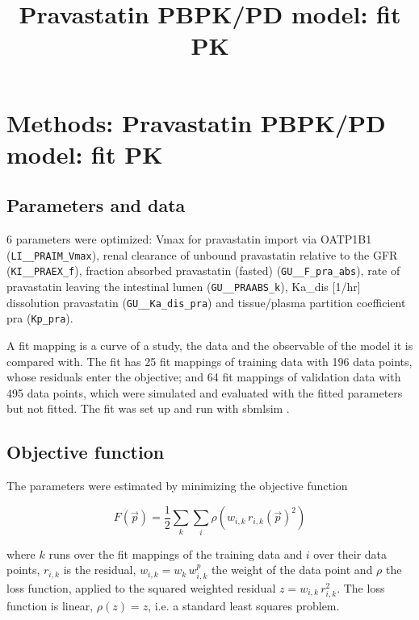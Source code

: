 \documentclass{article}
\title{Pravastatin PBPK/PD model: fit PK}
\date{}
\begin{document}
\maketitle

\section{Methods: Pravastatin PBPK/PD model: fit PK}

\subsection{Parameters and data}

6 parameters were optimized: Vmax for pravastatin import via OATP1B1 (\texttt{LI\_\_PRAIM\_Vmax}), renal clearance of unbound pravastatin relative to the GFR (\texttt{KI\_\_PRAEX\_f}), fraction absorbed pravastatin (fasted) (\texttt{GU\_\_F\_pra\_abs}), rate of pravastatin leaving the intestinal lumen (\texttt{GU\_\_PRAABS\_k}), Ka\_dis [1/hr] dissolution pravastatin (\texttt{GU\_\_Ka\_dis\_pra}) and tissue/plasma partition coefficient pra (\texttt{Kp\_pra}).

A fit mapping is a curve of a study, the data and the observable of the model it is compared with. The fit has 25 fit mappings of training data with 196 data points, whose residuals enter the objective; and 64 fit mappings of validation data with 495 data points, which were simulated and evaluated with the fitted parameters but not fitted. The fit was set up and run with sbmlsim \cite{Koenig2026_sbmlsim}.

\subsection{Objective function}

The parameters were estimated by minimizing the objective function

\begin{equation}
F(\vec{p}) = \frac{1}{2} \sum_{k} \sum_{i} \rho\left(w_{i,k}\, r_{i,k}(\vec{p})^2\right)
\end{equation}

where $k$ runs over the fit mappings of the training data and $i$ over their data points, $r_{i,k}$ is the residual, $w_{i,k} = w_k\, w^{p}_{i,k}$ the weight of the data point and $\rho$ the loss function, applied to the squared weighted residual $z = w_{i,k}\, r_{i,k}^2$. The loss function is linear, $\rho(z) = z$, i.e. a standard least squares problem.
\end{document}
